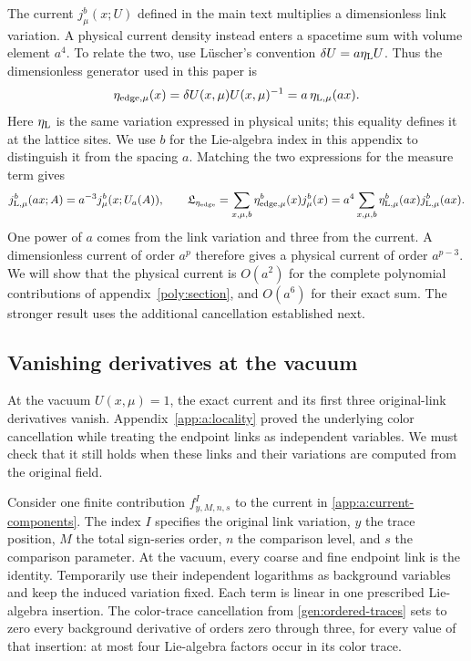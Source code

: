 \documentclass[11pt,a4paper]{article}
\theoremstyle{remark}
\begin{document}
The current $j_\mu^b(x;U)$ defined in the main text multiplies a
dimensionless link variation. A physical current density instead enters
a spacetime sum with volume element $a^4$. To relate the two, use
L\"uscher's convention $\delta U=a\eta_{\rm L}U$. Thus the
dimensionless generator used in this paper is
\begin{equation}
 \eta_{{\rm edge},\mu}(x)
   =\delta U(x,\mu)U(x,\mu)^{-1}
   =a\,\eta_{{\rm L},\mu}(ax).
\end{equation}
Here $\eta_{\rm L}$ is the same variation expressed in physical units;
this equality defines it at the lattice sites. We use $b$ for the
Lie-algebra index in this appendix to distinguish it from the spacing
$a$. Matching the two expressions for the measure term gives
\begin{equation}
 j_{{\rm L},\mu}^b(ax;A)
     =a^{-3}j_\mu^b(x;U_a(A)),\qquad
 \mathfrak L_{\eta_{\rm edge}}
     =\sum_{x,\mu,b}\eta_{{\rm edge},\mu}^b(x)j_\mu^b(x)
     =a^4\sum_{x,\mu,b}\eta_{{\rm L},\mu}^b(ax)
                                      j_{{\rm L},\mu}^b(ax).
\end{equation}
One power of $a$ comes from the link variation and three from the
current. A dimensionless current of order $a^p$ therefore gives a
physical current of order $a^{p-3}$. We will show that the physical
current is $O(a^2)$ for the complete polynomial contributions of
appendix~\ref{poly:section}, and $O(a^6)$ for their exact sum. The
stronger result uses the additional cancellation established next.

\subsection{Vanishing derivatives at the vacuum}
\label{app:a:vacuum-jets}

At the vacuum $U(x,\mu)=1$, the exact current and its first three
original-link derivatives vanish. Appendix~\ref{app:a:locality}
proved the underlying color cancellation while treating the endpoint
links as independent variables. We must check that it still holds when
these links and their variations are computed from the original field.

Consider one finite contribution $f^I_{y,M,n,s}$ to the current in
\eqref{app:a:current-components}. The index $I$ specifies the original
link variation, $y$ the trace position, $M$ the total sign-series order,
$n$ the comparison level, and $s$ the comparison parameter. At the
vacuum, every coarse and fine endpoint link is the identity. Temporarily
use their independent logarithms as background variables and keep the
induced variation fixed. Each term is linear in one prescribed
Lie-algebra insertion. The color-trace cancellation from
\eqref{gen:ordered-traces} sets to zero every background derivative of
orders zero through three, for every value of that insertion: at most
four Lie-algebra factors occur in its color trace.
\end{document}
